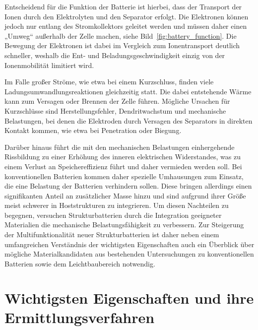 Entscheidend für die Funktion der Batterie ist hierbei, dass der Transport der Ionen durch den Elektrolyten und den Separator erfolgt. Die Elektronen können jedoch nur entlang des Stromkollektors geleitet werden und müssen daher einen „Umweg“ außerhalb der Zelle machen, siehe Bild~\ref{fig:battery_function}. Die Bewegung der Elektronen ist dabei im Vergleich zum Ionentransport deutlich schneller, weshalb die Ent- und Beladungsgeschwindigkeit einzig von der Ionenmobilität limitiert wird.

Im Falle großer Ströme, wie etwa bei einem Kurzschluss, finden viele Ladungsumwandlungsreaktionen gleichzeitig statt. Die dabei entstehende Wärme kann zum Versagen oder Brennen der Zelle führen. Mögliche Ursachen für Kurzschlüsse sind Herstellungsfehler, Dendritwachstum und mechanische Belastungen, bei denen die Elektroden durch Versagen des Separators in direkten Kontakt kommen, wie etwa bei Penetration oder Biegung.

Darüber hinaus führt die mit den mechanischen Belastungen einhergehende Rissbildung zu einer Erhöhung des inneren elektrischen Widerstandes, was zu einem Verlust an Speichereffizienz führt und daher vermieden werden soll. Bei konventionellen Batterien kommen daher spezielle Umhausungen zum Einsatz, die eine Belastung der Batterien verhindern sollen. Diese bringen allerdings einen signifikanten Anteil an zusätzlicher Masse hinzu und sind aufgrund ihrer Größe meist schwerer in Hoststrukturen zu integrieren. Um diesen Nachteilen zu begegnen, versuchen Strukturbatterien durch die Integration geeigneter Materialien die mechanische Belastungsfähigkeit zu verbessern. Zur Steigerung der Multifunktionalität neuer Strukturbatterien ist daher neben einem umfangreichen Verständnis der wichtigsten Eigenschaften auch ein Überblick über mögliche Materialkandidaten aus bestehenden Untersuchungen zu konventionellen Batterien sowie dem Leichtbaubereich notwendig.


\section{Wichtigsten Eigenschaften und ihre Ermittlungsverfahren}
